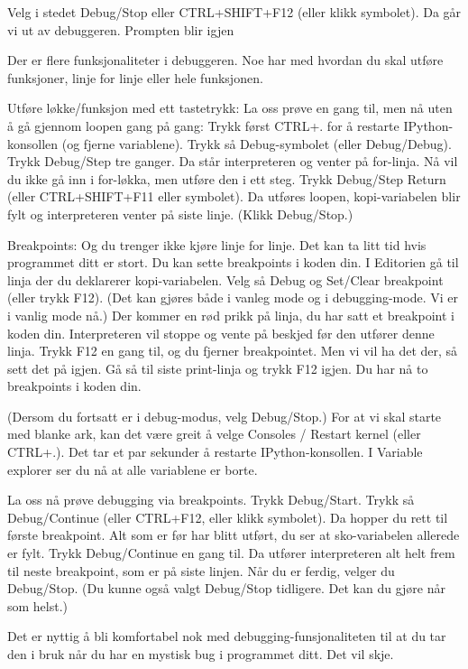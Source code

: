 Velg i stedet Debug/Stop eller CTRL+SHIFT+F12 (eller klikk symbolet). Da går vi ut av debuggeren. Prompten blir igjen 

Der er flere funksjonaliteter i debuggeren. Noe har med hvordan du skal utføre funksjoner, linje for linje eller hele funksjonen.

Utføre løkke/funksjon med ett tastetrykk: 
La oss prøve en gang til, men nå uten å gå gjennom loopen gang på gang:
Trykk først CTRL+. for å restarte IPython-konsollen (og fjerne variablene).
Trykk så Debug-symbolet (eller Debug/Debug).
Trykk Debug/Step tre ganger.
Da står interpreteren og venter på for-linja. 
Nå vil du ikke gå inn i for-løkka, men utføre den i ett steg.
Trykk Debug/Step Return (eller CTRL+SHIFT+F11 eller symbolet).
Da utføres loopen, kopi-variabelen blir fylt og interpreteren venter på siste linje.
(Klikk Debug/Stop.)


Breakpoints: 
Og du trenger ikke kjøre linje for linje.
Det kan ta litt tid hvis programmet ditt er stort. 
Du kan sette breakpoints i koden din.
I Editorien gå til linja der du deklarerer kopi-variabelen.
Velg så Debug og Set/Clear breakpoint (eller trykk F12).
(Det kan gjøres både i vanleg mode og i debugging-mode. Vi er i vanlig mode nå.) 
Der kommer en rød prikk på linja, du har satt et breakpoint i koden din.
Interpreteren vil stoppe og vente på beskjed før den utfører denne linja. 
Trykk F12 en gang til, og du fjerner breakpointet.
Men vi vil ha det der, så sett det på igjen.
Gå så til siste print-linja og trykk F12 igjen.
Du har nå to breakpoints i koden din.

(Dersom du fortsatt er i debug-modus, velg Debug/Stop.)
For at vi skal starte med blanke ark, kan det være greit å velge
Consoles / Restart kernel (eller CTRL+.).
Det tar et par sekunder å restarte IPython-konsollen.
I Variable explorer ser du nå at alle variablene er borte.

La oss nå prøve debugging via breakpoints.
Trykk Debug/Start.
Trykk så Debug/Continue (eller CTRL+F12, eller klikk symbolet). 
Da hopper du rett til første breakpoint. 
Alt som er før har blitt utført, du ser at sko-variabelen allerede er fylt.
Trykk Debug/Continue en gang til.
Da utfører interpreteren alt helt frem til neste breakpoint, som er på siste linjen.
Når du er ferdig, velger du Debug/Stop.
(Du kunne også valgt Debug/Stop tidligere. Det kan du gjøre når som helst.) 

Det er nyttig å bli komfortabel nok med debugging-funsjonaliteten til at du
tar den i bruk når du har en mystisk bug i programmet ditt.
Det vil skje. 

